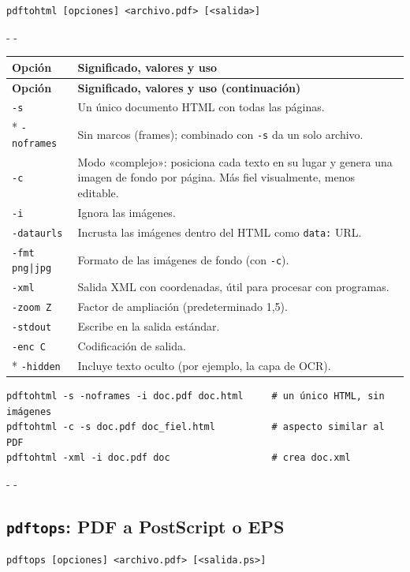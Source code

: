 \documentclass[11pt,a4paper]{article}
\makeatletter
\newcommand{\necesitaespacio}[1]{\par\penalty-100\begingroup
	\setlength{\dimen@}{#1}\dimen@ii\pagegoal\advance\dimen@ii-\pagetotal
	\ifdim\dimen@>\dimen@ii\ifdim\dimen@ii>\z@\vfil\fi\penalty-\@M\fi\endgroup}
\newenvironment{opciones}[1][Opción]{%
	\par\begingroup\small
	\begin{longtable}{L{4.25cm}L{11.2cm}}
		\toprule\rowcolor{tablacab}\cab{#1} & \cab{Significado, valores y uso} \\ \midrule
		\endfirsthead
		\toprule\rowcolor{tablacab}\cab{#1} & \cab{Significado, valores y uso (continuación)} \\ \midrule
		\endhead
		\bottomrule
		\endfoot}
	{\end{longtable}\endgroup}
\newcommand{\opt}[1]{\texttt{\textcolor{colopt}{#1}}}      %
\newcommand{\cab}[1]{\textbf{#1}}
\makeatother
\begin{document}
	\begin{lstlisting}[style=sintaxis]
pdftohtml [opciones] <archivo.pdf> [<salida>]
\end{lstlisting}
	
	\necesitaespacio{24\baselineskip}
	\begin{opciones}
		\opt{-s} & Un único documento HTML con todas las páginas.\\*
		\opt{-noframes} & Sin marcos (frames); combinado con \opt{-s} da un solo archivo.\\
		\opt{-c} & Modo «complejo»: posiciona cada texto en su lugar y genera una imagen de fondo por página. Más fiel visualmente, menos editable.\\
		\opt{-i} & Ignora las imágenes.\\
		\opt{-dataurls} & Incrusta las imágenes dentro del HTML como \texttt{data:} URL.\\
		\opt{-fmt png|jpg} & Formato de las imágenes de fondo (con \opt{-c}).\\
		\opt{-xml} & Salida XML con coordenadas, útil para procesar con programas.\\
		\opt{-zoom Z} & Factor de ampliación (predeterminado 1,5).\\
		\opt{-stdout} & Escribe en la salida estándar.\\
		\opt{-enc C} & Codificación de salida.\\*
		\opt{-hidden} & Incluye texto oculto (por ejemplo, la capa de OCR).\\
	\end{opciones}
	
	\begin{lstlisting}
pdftohtml -s -noframes -i doc.pdf doc.html     # un único HTML, sin imágenes
pdftohtml -c -s doc.pdf doc_fiel.html          # aspecto similar al PDF
pdftohtml -xml -i doc.pdf doc                  # crea doc.xml
\end{lstlisting}
	
	\necesitaespacio{8\baselineskip}
	\subsection{\texttt{pdftops}: PDF a PostScript o EPS}\label{sec:pdftops}
	
	\begin{lstlisting}[style=sintaxis]
pdftops [opciones] <archivo.pdf> [<salida.ps>]
\end{lstlisting}
	
\end{document}

